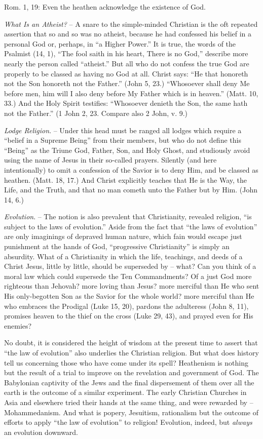 \documentclass[
]{book}
\begin{document}
Rom. 1, 19: Even the heathen acknowledge the existence of God.

\emph{What Is an Atheist?} -- A snare to the simple-minded Christian is the oft repeated assertion that so and so was no atheist, because he had confessed his belief in a personal God or, perhaps, in ``a Higher Power.'' It is true, the words of the Psalmist (14, 1), ``The fool saith in his heart, There is no God,'' describe more nearly the person called ``atheist.'' But all who do not confess the true God are properly to be classed as having no God at all. Christ says: ``He that honoreth not the Son honoreth not the Father.'' (John 5, 23.) ``Whosoever shall deny Me before men, him will I also deny before My Father which is in heaven.'' (Matt. 10, 33.) And the Holy Spirit testifies: ``Whosoever denieth the Son, the same hath not the Father.'' (1 John 2, 23. Compare also 2 John, v. 9.)

\emph{Lodge Religion}. -- Under this head must be ranged all lodges which require a ``belief in a Supreme Being'' from their members, but who do not define this ``Being'' as the Triune God, Father, Son, and Holy Ghost, and studiously avoid using the name of Jesus in their so-called prayers. Silently (and here intentionally) to omit a confession of the Savior is to deny Him, and be classed as heathen. (Matt. 18, 17.) And Christ explicitly teaches that He is the Way, the Life, and the Truth, and that no man cometh unto the Father but by Him. (John 14, 6.)

\emph{Evolution}. -- The notion is also prevalent that Christianity, revealed religion, ``is subject to the laws of evolution.'' Aside from the fact that ``the laws of evolution'' are only imaginings of depraved human nature, which fain would escape just punishment at the hands of God, ``progressive Christianity'' is simply an absurdity. What of a Christianity in which the life, teachings, and deeds of a Christ Jesus, little by little, should be superseded by -- what? Can you think of a moral law which could supersede the Ten Commandments? Of a just God more righteous than Jehovah? more loving than Jesus? more merciful than He who sent His only-begotten Son as the Savior for the whole world? more merciful than He who embraces the Prodigal (Luke 15, 20), pardons the adulteress (John 8, 11), promises heaven to the thief on the cross (Luke 29, 43), and prayed even for His enemies?

No doubt, it is considered the height of wisdom at the present time to assert that ``the law of evolution'' also underlies the Christian religion. But what does history tell us concerning those who have come under its spell? Heathenism is nothing but the result of a trial to improve on the revelation and government of God. The Babylonian captivity of the Jews and the final dispersement of them over all the earth is the outcome of a similar experiment. The early Christian Churches in Asia and elsewhere tried their hands at the same thing, and were rewarded by -- Mohammedanism. And what is popery, Jesuitism, rationalism but the outcome of efforts to apply ``the law of evolution'' to religion! Evolution, indeed, but \emph{always} an evolution downward.
\end{document}

